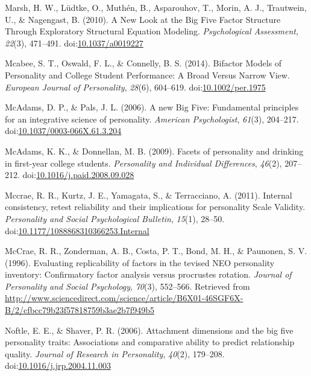 \documentclass[,man,floatsintext]{apa6}
\begin{document}
\hypertarget{ref-Marsh2010}{}
Marsh, H. W., Lüdtke, O., Muthén, B., Asparouhov, T., Morin, A. J.,
Trautwein, U., \& Nagengast, B. (2010). A New Look at the Big Five
Factor Structure Through Exploratory Structural Equation Modeling.
\emph{Psychological Assessment}, \emph{22}(3), 471--491.
doi:\href{https://doi.org/10.1037/a0019227}{10.1037/a0019227}

\hypertarget{ref-Mcabee2014}{}
Mcabee, S. T., Oswald, F. L., \& Connelly, B. S. (2014). Bifactor Models
of Personality and College Student Performance: A Broad Versus Narrow
View. \emph{European Journal of Personality}, \emph{28}(6), 604--619.
doi:\href{https://doi.org/10.1002/per.1975}{10.1002/per.1975}

\hypertarget{ref-McAdams2006a}{}
McAdams, D. P., \& Pals, J. L. (2006). A new Big Five: Fundamental
principles for an integrative science of personality. \emph{American
Psychologist}, \emph{61}(3), 204--217.
doi:\href{https://doi.org/10.1037/0003-066X.61.3.204}{10.1037/0003-066X.61.3.204}

\hypertarget{ref-McAdams2009}{}
McAdams, K. K., \& Donnellan, M. B. (2009). Facets of personality and
drinking in first-year college students. \emph{Personality and
Individual Differences}, \emph{46}(2), 207--212.
doi:\href{https://doi.org/10.1016/j.paid.2008.09.028}{10.1016/j.paid.2008.09.028}

\hypertarget{ref-Mccrae2011}{}
Mccrae, R. R., Kurtz, J. E., Yamagata, S., \& Terracciano, A. (2011).
Internal consistency, retest reliability and their implications for
personality Scale Validity. \emph{Personality and Social Psychological
Bulletin}, \emph{15}(1), 28--50.
doi:\href{https://doi.org/10.1177/1088868310366253.Internal}{10.1177/1088868310366253.Internal}

\hypertarget{ref-McCrae1996}{}
McCrae, R. R., Zonderman, A. B., Costa, P. T., Bond, M. H., \& Paunonen,
S. V. (1996). Evaluating replicability of factors in the tevised NEO
personality inventory: Confirmatory factor analysis versus procrustes
rotation. \emph{Journal of Personality and Social Psychology},
\emph{70}(3), 552--566. Retrieved from
\url{http://www.sciencedirect.com/science/article/B6X01-46SGF6X-B/2/cfbcc79b23f57818759b3ae2b7f949b5}

\hypertarget{ref-Noftle2006}{}
Noftle, E. E., \& Shaver, P. R. (2006). Attachment dimensions and the
big five personality traits: Associations and comparative ability to
predict relationship quality. \emph{Journal of Research in Personality},
\emph{40}(2), 179--208.
doi:\href{https://doi.org/10.1016/j.jrp.2004.11.003}{10.1016/j.jrp.2004.11.003}
\end{document}
